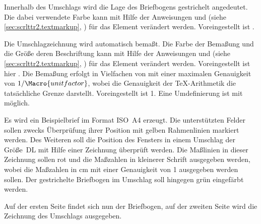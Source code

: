 %
Innerhalb des Umschlags wird die Lage des Briefbogens gestrichelt
angedeutet. Die dabei verwendete Farbe kann mit Hilfe der Anweisungen
 und 
(siehe \autoref{sec:scrlttr2.textmarkup},
) für das Element
 verändert
werden. Voreingestellt ist .%

%
Die Umschlagzeichnung wird automatisch bemaßt. Die Farbe der Bemaßung und die
Größe deren Beschriftung kann mit Hilfe der Anweisungen
 und 
(siehe \autoref{sec:scrlttr2.textmarkup},
) für das Element
 verändert
werden. Voreingestellt ist hier . Die Bemaßung erfolgt in
Vielfachen von  mit einer maximalen Genauigkeit von
$1/\Macro{unitfactor}$, wobei die Genauigkeit der \TeX-Arithmetik die
tatsächliche Grenze darstellt. Voreingestellt ist 1. Eine Umdefinierung ist
mit  möglich.%

\begin{Example}
  Es wird ein Beispielbrief im Format ISO~A4 erzeugt. Die unterstützten Felder
  sollen zwecks Überprüfung ihrer Position mit gelben Rahmenlinien markiert
  werden. Des Weiteren soll die Position des Fensters in einem Umschlag der
  Größe~DL mit Hilfe einer Zeichnung überprüft werden. Die Maßlinien in dieser
  Zeichnung sollen rot und die Maßzahlen in kleinerer Schrift ausgegeben
  werden, wobei die Maßzahlen in cm mit einer Genauigkeit von 1
  ausgegeben werden sollen. Der gestrichelte Briefbogen im Umschlag soll
  hingegen grün eingefärbt werden.
  Auf der ersten Seite findet sich nun der Briefbogen, auf der zweiten Seite
  wird die Zeichnung des Umschlags ausgegeben.
\end{Example}


